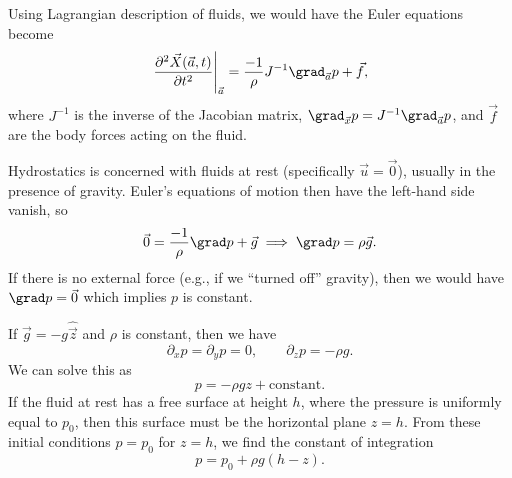 \begin{node}
\begin{node}\label{fluids:euler-flow-0006}%
Using Lagrangian description of fluids, we would have the Euler
equations become
\begin{equation}
\left.\frac{\partial^{2}\vec{X}(\vec{a},t)}{\partial t^{2}}\right|_{\vec{a}}
=\frac{-1}{\rho}J^{-1}\grad_{\vec{a}}p+\vec{f},
\end{equation}
where $J^{-1}$ is the inverse of the Jacobian matrix,
$\grad_{\vec{x}}p=J^{-1}\grad_{\vec{a}}p$, and $\vec{f}$ are the body
forces acting on the fluid.
\end{node}
\end{node}

\begin{node}[Hydrostatics]\label{fluids:euler-flow-0007}%
Hydrostatics is concerned with fluids at rest (specifically $\vec{u}=\vec{0}$),
usually in the presence of gravity. Euler's equations of motion then
have the left-hand side vanish, so
\begin{equation}
\vec{0}=\frac{-1}{\rho}\grad p + \vec{g}\implies\grad p =\rho\vec{g}.
\end{equation}
If there is no external force (e.g., if we ``turned off'' gravity), then
we would have $\grad p=\vec{0}$ which implies $p$ is constant.

If $\vec{g}=-g\widehat{\vec{z}}$ and $\rho$ is constant, then we have
\[\partial_{x}p=\partial_{y}p=0,\qquad\partial_{z}p=-\rho g.\]
We can solve this as
\[p=-\rho gz+\mbox{constant}.\]
If the fluid at rest has a free surface at height $h$, where the
pressure is uniformly equal to $p_{0}$, then this surface must be the
horizontal plane $z=h$. From these initial conditions $p=p_{0}$ for
$z=h$, we find the constant of integration
\begin{equation}\label{eq:fluids:euler-flow:hydrostatic}
p=p_{0}+\rho g(h-z).
\end{equation}



\end{node}

